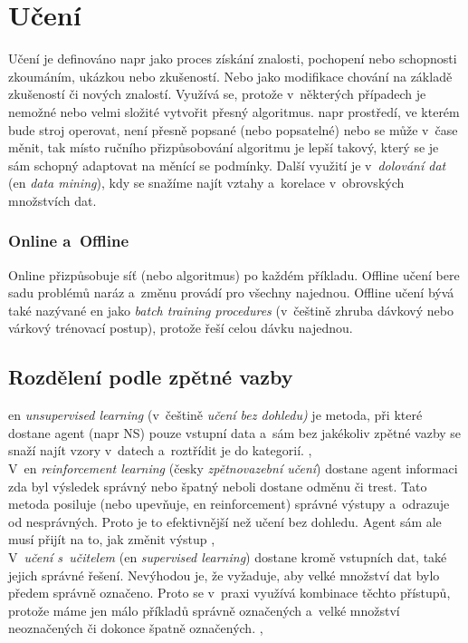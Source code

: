 \documentclass[12pt,oneside]{report}			%
\begin{document}
	\section{Učení}
	\label{sec:learning}	
	Učení je definováno \gls{napr} jako proces získání znalosti, pochopení nebo schopnosti zkoumáním, ukázkou nebo zkušeností. Nebo jako modifikace chování na základě zkušeností či nových znalostí. Využívá se, protože v~některých případech je nemožné nebo velmi složité vytvořit přesný algoritmus. \Gls{napr}  prostředí, ve kterém bude stroj operovat, není přesně popsané (nebo popsatelné) nebo se může v~čase měnit, tak místo ručního přizpůsobování algoritmu je lepší takový, který se je sám schopný adaptovat na měnící se podmínky. Další využití je v~\emph{dolování dat} (\gls{en} \emph{data mining}), kdy se snažíme najít vztahy a~korelace v~obrovských množstvích dat. \parencite[\gls{s} 1-3]{introductionML}
	\subsubsection{Online a~Offline}
	\label{sec:on-off-lol}
	Online přizpůsobuje síť (nebo algoritmus) po každém příkladu. Offline učení bere sadu problémů naráz a~změnu provádí pro všechny najednou. Offline učení bývá také nazývané \gls{en} jako \emph{batch training procedures} (v~češtině zhruba dávkový nebo várkový trénovací postup), protože řeší celou dávku najednou. \parencite[\gls{s} 54]{NN_introduction-Kriessel} \\
	 
	\subsection{Rozdělení podle zpětné vazby}
	\label{sec:AI-deleni}
	\Gls{en} \emph{unsupervised learning} (v~češtině \emph{učení bez dohledu)} je metoda, při které dostane agent (\gls{napr} \gls{NS}) pouze vstupní data a~sám bez jakékoliv zpětné vazby se snaží najít vzory v~datech a~roztřídit je do kategorií. \parencite[\gls{s} 694-695]{AIAMA}, \parencite[\gls{str} 52]{NN_introduction-Kriessel}\\
	V~\gls{en} \emph{reinforcement learning} (česky \emph{zpětnovazební učení}) dostane agent informaci zda byl výsledek správný nebo špatný neboli dostane odměnu či trest. Tato metoda posiluje (nebo upevňuje, \gls{en} reinforcement) správné výstupy  a~odrazuje od nesprávných. Proto je to efektivnější než učení bez dohledu. Agent sám ale musí přijít na to, jak změnit výstup \parencite[\gls{s} 695]{AIAMA}, \parencite[\gls{str} 53]{NN_introduction-Kriessel}\\
	V~\emph{učení s~učitelem} (\gls{en} \emph{supervised learning}) dostane kromě vstupních dat, také jejich správné řešení. Nevýhodou je, že vyžaduje, aby velké množství dat bylo předem správně označeno. Proto se v~praxi využívá kombinace těchto přístupů, protože máme jen málo příkladů správně označených a~velké množství neoznačených či dokonce špatně označených. \parencite[\gls{s} 695]{AIAMA}, \parencite[\gls{str} 53]{NN_introduction-Kriessel}\\
	
\end{document}
